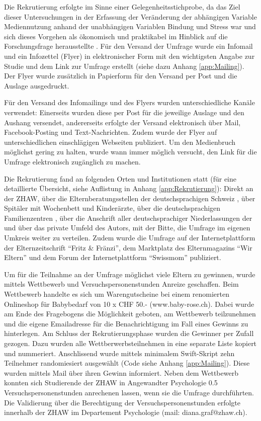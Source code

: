 Die Rekrutierung erfolgte im Sinne einer Gelegenheitsstichprobe, da das Ziel dieser Untersuchungen in der Erfassung der Veränderung der abhängigen Variable Mediennutzung anhand der unabhängigen Variablen Bindung und Stress war und sich dieses Vorgehen als ökonomisch und praktikabel im Hinblick auf die Forschungsfrage herausstellte \cite{TUDresden2015}. Für den Versand der Umfrage wurde ein Infomail und ein Infozettel (Flyer) in elektronischer Form mit den wichtigsten Angabe zur Studie und dem Link zur Umfrage erstellt (siehe dazu Anhang \ref{app:Mailing}). Der Flyer wurde zusätzlich in Papierform für den Versand per Post und die Auslage ausgedruckt. 

Für den Versand des Infomailings und des Flyers wurden unterschiedliche Kanäle verwendet: Einerseits wurden diese per Post für die jeweilige Auslage und den Aushang versendet, andererseits erfolgte der Versand elektronisch über Mail, Facebook-Posting und Text-Nachrichten. Zudem wurde der Flyer auf unterschiedlichen einschlägigen Webseiten publiziert. Um den Medienbruch möglichst gering zu halten, wurde wann immer möglich versucht, den Link für die Umfrage elektronisch zugänglich zu machen. 

Die Rekrutierung fand an folgenden Orten und Institutionen statt (für eine detaillierte Übersicht, siehe Auflistung in Anhang \ref{app:Rekrutierung}): Direkt an der ZHAW, über die Elternberatungsstellen der deutschsprachigen Schweiz \cite{Sfmvb2018}, über Spitäler mit Wochenbett und Kinderärzte, über die deutschsprachigen Familienzentren \cite{NetzwerkBildung2018}, über die Anschrift aller deutschsprachiger Niederlassungen der  und über das private Umfeld des Autors, mit der Bitte, die Umfrage im eigenen Umkreis weiter zu verteilen. Zudem wurde die Umfrage auf der Internetplattform der Elternzeitschrift \enquote{Fritz \&  Fränzi}, dem Marktplatz des Elternmagazins \enquote{Wir Eltern} und dem Forum der Internetplattform \enquote{Swissmom} publiziert.

Um für die Teilnahme an der Umfrage möglichst viele Eltern zu gewinnen, wurde mittels Wettbewerb und Versuchspersonenstunden Anreize geschaffen. Beim Wettbewerb handelte es sich um Warengutscheine bei einem renomierten Onlineshop für Babybedarf von 10 x CHF 50.- (www.baby-rose.ch). Dabei wurde am Ende des Fragebogens die Möglichkeit geboten, am Wettbewerb teilzunehmen und die eigene Emailadresse für die Benachrichtigung im Fall eines Gewinns zu hinterlegen. Am Schluss der Rekrutierungsphase wurden die Gewinner per Zufall gezogen. Dazu wurden alle Wettberwerbsteilnehmen in eine separate Liste kopiert und nummeriert. Anschlissend wurde mittels minimalem Swift-Skript \cite{Swift2017} zehn Teilnehmer randomiesiert ausgewählt (Code siehe Anhang \ref{app:Mailing}). Diese wurden mittels Mail über ihren Gewinn informiert. Neben dem Wettbewerb konnten sich Studierende der ZHAW in Angewandter Psychologie 0.5 Versuchspersonenstunden anrechenen lassen, wenn sie die Umfrage durchführten. Die Validierung über die Berechtigung der Versuchspersonenstunden erfolgte innerhalb der ZHAW im Departement Psychologie (mail: diana.graf@zhaw.ch). 

